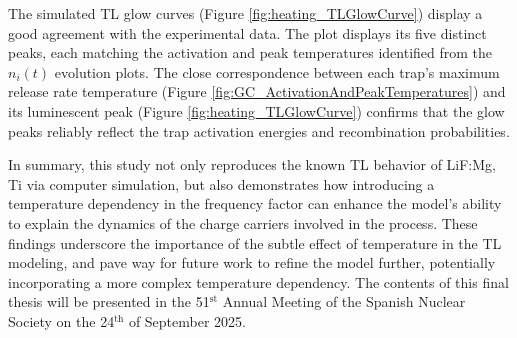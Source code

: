 \vspace{10pt}

The simulated TL glow curves (Figure \ref{fig:heating_TLGlowCurve}) display a good agreement with the experimental data. The plot displays its five distinct peaks, each matching the activation and peak temperatures identified from the $n_i(t)$ evolution plots. The close correspondence between each trap's maximum release rate temperature (Figure \ref{fig:GC_ActivationAndPeakTemperatures}) and its luminescent peak (Figure \ref{fig:heating_TLGlowCurve}) confirms that the glow peaks reliably reflect the trap activation energies and recombination probabilities.

\vspace{10pt}

In summary, this study not only reproduces the known TL behavior of LiF:Mg, Ti via computer simulation, but also demonstrates how introducing a temperature dependency in the frequency factor can enhance the model's ability to explain the dynamics of the charge carriers involved in the process. These findings underscore the importance of the subtle effect of temperature in the TL modeling, and pave way for future work to refine the model further, potentially incorporating a more complex temperature dependency. The contents of this final thesis will be presented in the 51$^{\text{st}}$ Annual Meeting of the Spanish Nuclear Society on the 24$^{\text{th}}$ of September 2025.